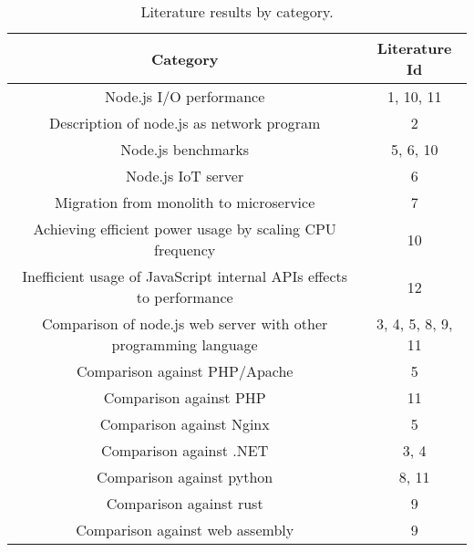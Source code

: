 \begin{table}[ht!]
    \begin{tabular}{|c c|} 
        \hline
        Category
        & Literature Id
        \\ 
        \hline\hline
        Node.js I/O performance
        & 1, 10, 11
        \\ 
    
        Description of node.js as network program
        & 2
        \\ 
    
        Node.js benchmarks
        & 5, 6, 10
        \\ 
    
        Node.js IoT server
        & 6
        \\ 
    
        Migration from monolith to microservice
        & 7
        \\ 
    
        Achieving efficient power usage by scaling CPU frequency
        & 10
        \\ 
    
        Inefficient usage of JavaScript internal APIs effects to performance
        & 12
        \\ 
    
        Comparison of node.js web server with other programming language
        & 3, 4, 5, 8, 9, 11
        \\ 
    
        Comparison against PHP/Apache
        & 5
        \\ 
    
        Comparison against PHP
        & 11
        \\ 
    
        Comparison against Nginx
        & 5
        \\
    
        Comparison against .NET
        & 3, 4
        \\
    
        Comparison against python
        & 8, 11
        \\
    
        Comparison against rust
        & 9
        \\
    
        Comparison against web assembly
        & 9
        \\
        \hline
    \end{tabular}    
    \caption{Literature results by category.}
    \label{table:literature:resulstByCategory}
\end{table}

